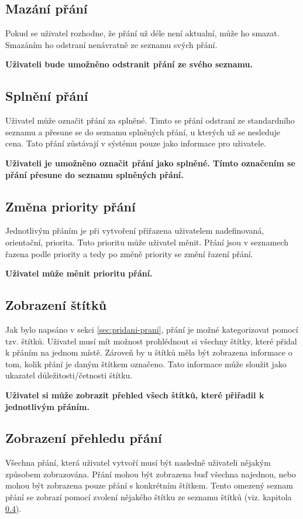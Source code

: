 \subsection{Mazání přání}
Pokud se uživatel rozhodne, že přání už déle není aktualní, může ho smazat. Smazáním ho odstraní nenávratně ze seznamu svých přání.

\textbf{Uživateli bude umožněno odstranit přání ze svého seznamu.}

\subsection{Splnění přání}
Uživatel může označit přání za splněné. Timto se přání odstraní ze standardního seznamu a přesune se do seznamu splněných přání, u kterých už se nesleduje cena. Tato přání zůstávají v sýstému pouze jako informace pro uživatele.

\textbf{Uživateli je umožněno označit přání jako splněné. Tímto označením se přání přesune do seznamu splněných přání.}

\subsection{Změna priority přání}
Jednotlivým přáním je při vytvoření přiřazena uživatelem nadefinovaná, orientační, priorita. Tuto prioritu může uživatel měnit. Přání jsou v seznamech řazena podle priority a tedy po změně priority se změní řazení přání.

\textbf{Uživatel může měnit prioritu přání.}

\subsection{Zobrazení štítků}
\label{sec:zobrazeni-stitku}
Jak bylo napsáno v sekci \ref{sec:pridani-prani}, přání je možné kategorizovat pomocí tzv. štítků. Uživatel musí mít možnost prohlédnout si všechny štítky, které přidal k přáním na jednom místě. Zároveň by u štítků měla být zobrazena informace o tom, kolik přání je daným štítkem označeno. Tato informace může sloužit jako ukazatel důležitosti/četnosti štítku.

\textbf{Uživatel si může zobrazit přehled všech štítků, které přiřadil k jednotlivým přáním.}

\subsection{Zobrazení přehledu přání}
Všechna přání, která uživatel vytvoří musí být nasledně uživateli nějakým způsobem zobrazována. Přání mohou být zobrazena buď všechna najednou, nebo mohou být zobrazena pouze přání s konkrétním štítkem. Tento omezený seznam přání se zobrazí pomocí zvolení nějakého štítku ze seznamu štítků (viz. kapitola \ref{sec:zobrazeni-stitku}).

